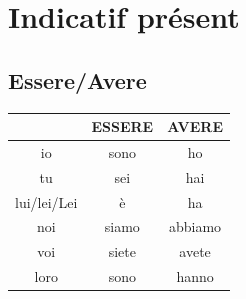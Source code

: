 \documentclass[12pt, openany]{report}
\begin{document}
\section{Indicatif présent}
\subsection{Essere/Avere}
\begin{center}
    \begin{tabular}{c|c|c}
        & ESSERE & AVERE \\ \hline
        io & sono & ho\\
        tu & sei & hai\\
        lui/lei/Lei & è & ha\\ 
        noi & siamo & abbiamo \\
        voi & siete & avete \\
        loro & sono & hanno\\
    \end{tabular}
\end{center}
\end{document}
